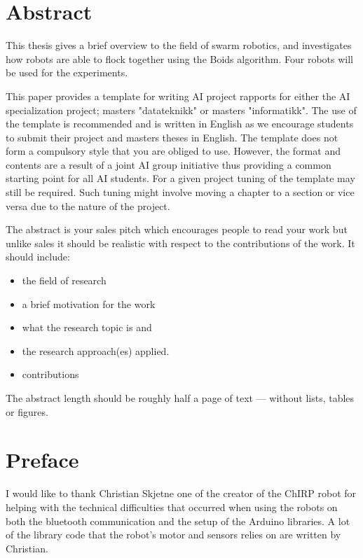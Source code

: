 \section*{Abstract}
\label{sec:abstract}

This thesis gives a brief overview to the field of swarm robotics, and investigates how robots are able to flock together using the Boids algorithm.
Four robots will be used for the experiments.


This paper provides a template for writing AI project rapports for either the AI specialization project; masters "datateknikk" or masters "informatikk". The use of the template is recommended and is written in English as we encourage students to submit their project and masters theses in English. 
The template does not form a compulsory style that you are obliged to use. However, the format and contents are a result of a joint AI group initiative thus providing a common starting point for all AI students. For a given project tuning of the template may still be required. Such tuning might involve moving a chapter to a section or vice versa due to the nature of the project. 

The abstract is your sales pitch which encourages people to read your work but unlike sales it should be realistic with respect to the contributions of the work. It should include:
\begin{itemize}
\item the field of research
\item a brief motivation for the work
\item what the research topic is and
\item the research approach(es) applied. 
\item contributions
\end{itemize}

The abstract length should be roughly half a page of text --- without lists, tables or figures.  

\clearpage

\section*{Preface}



\vspace{1cm}

I would like to thank Christian Skjetne one of the creator of the ChIRP robot for helping with the technical difficulties that occurred when using the robots on both the bluetooth communication and the setup of the Arduino libraries. A lot of the library code that the robot's motor and sensors relies on are written by Christian.

